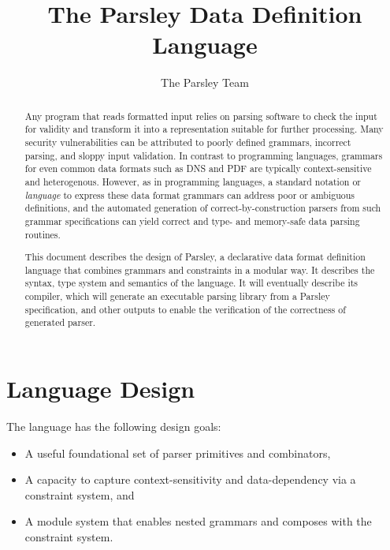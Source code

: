\documentclass[letterpaper]{article}
\title{The Parsley Data Definition Language}
\author{The Parsley Team}
\begin{document}
\maketitle

\begin{abstract}
  Any program that reads formatted input relies on parsing software to
  check the input for validity and transform it into a representation
  suitable for further processing.  Many security vulnerabilities can
  be attributed to poorly defined grammars, incorrect parsing, and
  sloppy input validation.  In contrast to programming languages,
  grammars for even common data formats such as DNS and PDF are
  typically context-sensitive and heterogenous.  However, as in
  programming languages, a standard notation or {\em language} to
  express these data format grammars can address poor or ambiguous
  definitions, and the automated generation of correct-by-construction
  parsers from such grammar specifications can yield correct and type-
  and memory-safe data parsing routines.

  This document describes the design of Parsley, a declarative data
  format definition language that combines grammars and constraints in
  a modular way.  It describes the syntax, type system and semantics
  of the language.  It will eventually describe its compiler, which
  will generate an executable parsing library from a Parsley
  specification, and other outputs to enable the verification of the
  correctness of generated parser.
\end{abstract}

\section{Language Design}
\label{s:design}

The language has the following design goals:

\begin{itemize}
\item A useful foundational set of parser primitives and combinators,
\item A capacity to capture context-sensitivity and data-dependency
  via a constraint system, and
\item  A module system that enables nested grammars and composes with
  the constraint system.
\end{itemize}
\end{document}
